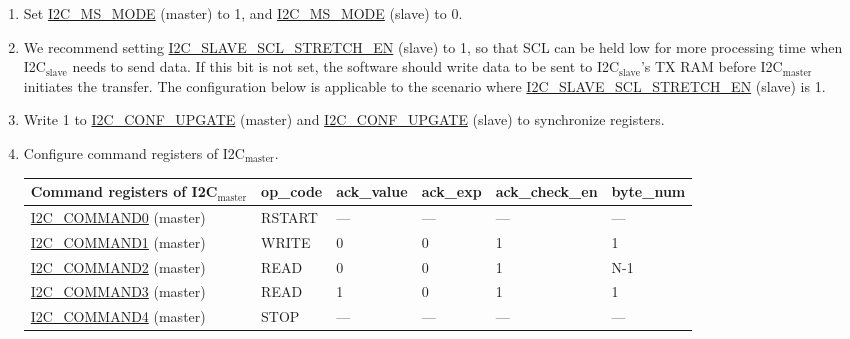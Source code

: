 \documentclass[main\_\_EN.tex]{subfiles}
\begin{document}
\begin{enumerate}
\item Set \hyperref[fielddesc:I2CMSMODE]{I2C\_MS\_MODE} (master) to 1, and \hyperref[fielddesc:I2CMSMODE]{I2C\_MS\_MODE} (slave) to 0.
\item We recommend setting \hyperref[fielddesc:I2CSLAVESCLSTRETCHEN]{I2C\_SLAVE\_SCL\_STRETCH\_EN} (slave) to 1, so that SCL can be held low for more processing time when I2C$_\text{slave}$ needs to send data. If this bit is not set, the software should write data to be sent to I2C$_\text{slave}$'s TX RAM before I2C$_\text{master}$ initiates the transfer. The configuration below is applicable to the scenario where \hyperref[fielddesc:I2CSLAVESCLSTRETCHEN]{I2C\_SLAVE\_SCL\_STRETCH\_EN} (slave) is 1.
\item Write 1 to \hyperref[fielddesc:I2CCONFUPGATE]{I2C\_CONF\_UPGATE} (master) and \hyperref[fielddesc:I2CCONFUPGATE]{I2C\_CONF\_UPGATE} (slave) to synchronize registers.
\item Configure command registers of I2C$_\text{master}$.

\begin{longtable}{ | p{5cm} | p{1.5cm} | p{1.5cm} | p{1.5cm} |p{2.5cm} | p{1.5cm} |}
\hline\rowcolor{lightgray}
Command registers of I2C$_\text{master}$& op\_code & ack\_value&ack\_exp&ack\_check\_en&byte\_num  \\ \hline
\hyperref[fielddesc:I2CCOMMAND0]{I2C\_COMMAND0} (master)& RSTART& ---&---&---&---  \\ \hline
\hyperref[fielddesc:I2CCOMMAND1]{I2C\_COMMAND1} (master)& WRITE& 0&0&1&1  \\ \hline
\hyperref[fielddesc:I2CCOMMAND2]{I2C\_COMMAND2} (master)& READ& 0&0&1&N-1  \\ \hline
\hyperref[fielddesc:I2CCOMMAND3]{I2C\_COMMAND3} (master)& READ& 1&0&1&1  \\ \hline
\hyperref[fielddesc:I2CCOMMAND4]{I2C\_COMMAND4} (master)& STOP& ---&---&---&---  \\ \hline
\end{longtable}


\end{enumerate}
\end{document}
